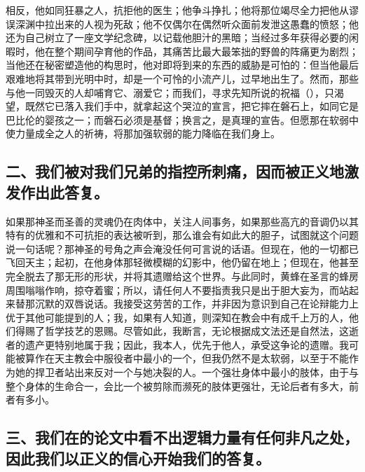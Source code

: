 相反，他如同狂暴之人，抗拒他的医生；他争斗挣扎；他将那位竭尽全力把他从谬误深渊中拉出来的人视为死敌；他不仅偶尔在偶然听众面前发泄这愚蠢的愤怒；他还为自己树立了一座文学纪念碑，以记载他胆汁的黑暗；当经过多年获得必要的闲暇时，他在整个期间孕育他的作品，其痛苦比最大最笨拙的野兽的阵痛更为剧烈；当他还在秘密塑造他的构思时，他对即将到来的东西的威胁是可怕的：但当他最后艰难地将其带到光明中时，却是一个可怜的小流产儿，过早地出生了。然而，那些与他一同毁灭的人却哺育它、溺爱它；而我们，寻求先知所说的祝福（），只渴望，既然它已落入我们手中，就拿起这个哭泣的宣言，把它摔在磐石上，如同它是巴比伦的婴孩之一；而磐石必须是基督；换言之，是真理的宣告。但愿那在软弱中使力量成全之人的祈祷，将那加强软弱的能力降临在我们身上。\par


\subsection{二、我们被对我们兄弟的指控所刺痛，因而被正义地激发作出此答复。}

如果那神圣而圣善的灵魂仍在肉体中，关注人间事务，如果那些高亢的音调仍以其特有的优雅和不可抗拒的表达被听到，那么谁会有如此大的胆子，试图就这个问题说一句话呢？那神圣的号角之声会淹没任何可言说的话语。但现在，他的一切都已飞回天主；起初，在他身体那轻微模糊的幻影中，他仍留在地上；但现在，他甚至完全脱去了那无形的形状，并将其遗赠给这个世界。与此同时，黄蜂在圣言的蜂房周围嗡嗡作响，掠夺着蜜；所以，请任何人不要指责我只是出于胆大妄为，而站起来替那沉默的双唇说话。我接受这劳苦的工作，并非因为意识到自己在论辩能力上优于其他可能提到的人；我，如果有人知道，则深知在教会中有成千上万的人，他们得赐了哲学技艺的恩赐。尽管如此，我断言，无论根据成文法还是自然法，这逝者的遗产更特别地属于我；因此，我本人，优先于他人，承受这争论的遗赠。我可能被算作在天主教会中服役者中最小的一个，但我仍然不是太软弱，以至于不能作为她的捍卫者站出来反对一个与她决裂的人。一个强壮身体中最小的肢体，由于与整个身体的生命合一，会比一个被剪除而濒死的肢体更强壮，无论后者有多大，前者有多小。\par


\subsection{三、我们在的论文中看不出逻辑力量有任何非凡之处，因此我们以正义的信心开始我们的答复。}

